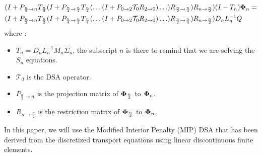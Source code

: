 \begin{equation}
\begin{split}
&(I+P_{\frac{n}{2}\rightarrow n }
T_{\frac{n}{2}} (I+P_{\frac{n}{4}\rightarrow\frac{n}{2}}T_{\frac{n}{4}} (\hdots
(I+P_{0\rightarrow 2} \mathcal{T}_0 R_{2\rightarrow 0})\hdots)
R_{\frac{n}{2}\rightarrow \frac{n}{4}})R_{n\rightarrow\frac{n}{2}})(I-T_n)
\boldsymbol{\Phi}_n =\\
& (I+P_{\frac{n}{2}\rightarrow n} T_{\frac{n}{2}} (I+P_{\frac{n}{4}
\rightarrow \frac{n}{2}} T_{\frac{n}{4}} (\hdots (I+P_{0 \rightarrow
2}\mathcal{T}_0 R_{2\rightarrow 0})\hdots)R_{\frac{n}{2}\rightarrow
\frac{n}{4}})R_{n\rightarrow \frac{n}{2}} ) D_n L_n^{-1} Q
\end{split}
\end{equation}  
where :
\begin{itemize}
\item $T_n = D_n L_n^{-1}M_n \Sigma_n$, the subscript $n$ is there to remind
that we are solving the $S_n$ equations.
\item $\mathcal{T}_0$ is the DSA operator.
\item $P_{\frac{n}{2}\rightarrow n}$ is the projection matrix of
$\boldsymbol{\Phi}_{\frac{n}{2}}$ to $\boldsymbol{\Phi}_n$.
\item $R_{n\rightarrow \frac{n}{2}}$ is the restriction matrix of
$\boldsymbol{\Phi}_{\frac{n}{2}}$ to $\boldsymbol{\Phi}_n$.
\end{itemize}
In this paper, we will use the Modified Interior Penalty (MIP) DSA \cite{mip}
that has been derived from the discretized transport equations using linear
discontinuous finite elements.
